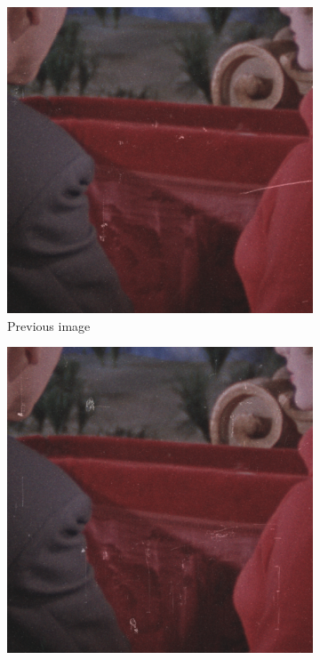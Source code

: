 \begin{figure}[H]
	\centering
	\begin{subfigure}{.3\textwidth}
		\centering
		\includegraphics[width=\linewidth]{introduction/previous.png}
		\caption[figure]{Previous image}
		\label{fig:flow_flow1}
	\end{subfigure}
	\begin{subfigure}{.3\textwidth}
		\centering
		\includegraphics[width=\linewidth]{introduction/input_save.png}

\end{subfigure}
\end{figure}
